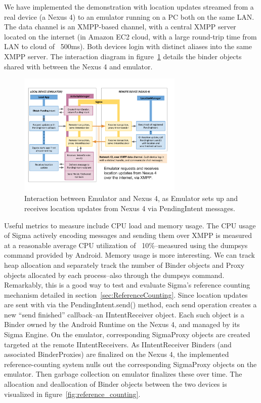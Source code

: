 \documentclass[prodmode]{acmlarge}
\begin{document}
We have implemented the demonstration with location updates streamed from a real device (a Nexus 4) to an emulator running on a PC both on the same LAN. The data channel is an XMPP-based channel, with a central XMPP server located on the internet (in Amazon EC2 cloud, with a large round-trip time from LAN to cloud of ~500ms). Both devices login with distinct aliases into the same XMPP server. The interaction diagram in figure~\ref{fig:LocationUpdateInteraction} details the binder objects shared with between the Nexus 4 and emulator.

\begin{figure}[h]
\centering
\includegraphics[width=0.7\textwidth]{drawings/LocationPendingIntentExample.pdf}
\caption{Interaction between Emulator and Nexus 4, as Emulator sets up and receives location updates from Nexus 4 via PendingIntent messages.}
\label{fig:LocationUpdateInteraction}
\end{figure}

Useful metrics to measure include CPU load and memory usage. The CPU usage of Sigma actively encoding messages and sending them over XMPP is measured at a reasonable average CPU utilization of ~10\%--measured using the dumpsys command provided by Android. Memory usage is more interesting. We can track heap allocation and separately track the number of Binder objects and Proxy objects allocated by each process--also through the dumpsys command. Remarkably, this is a good way to test and evaluate Sigma's reference counting mechanism detailed in section~\ref{sec:ReferenceCounting}. Since location updates are sent with via the PendingIntent.send() method, each send operation creates a new ``send finished'' callback--an IIntentReceiver object. Each such object is a Binder owned by the Android Runtime on the Nexus 4, and managed by its Sigma Engine. On the emulator, corresponding SigmaProxy objects are created targeted at the remote IIntentReceivers. As IIntentReceiver Binders (and associated BinderProxies) are finalized on the Nexus 4, the implemented reference-counting system nulls out the corresponding SigmaProxy objects on the emulator. Then garbage collection on emulator finalizes these over time. The allocation and deallocation of Binder objects between the two devices is visualized in figure~\ref{fig:reference_counting}.
\end{document}
